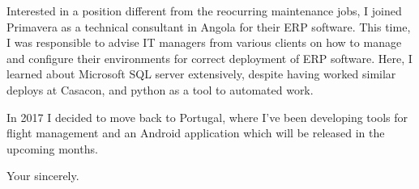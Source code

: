 \documentclass{letter}
\renewcommand*{\closing}[1]{\par\nobreak\vspace{\parskip}%
\vspace{2\parskip}%
#1\\[6\medskipamount]%
\fromsig
}
\begin{document}
\begin{letter}{}
Interested in a position different from the reocurring maintenance jobs, I joined Primavera as a
technical consultant in Angola for their ERP software. This time, I was responsible to advise IT
managers from various clients on how to manage and configure their environments for correct
deployment of ERP software. Here, I learned about Microsoft SQL server extensively, despite having
worked similar deploys at Casacon, and python as a tool to automated work.

In 2017 I decided to move back to Portugal, where I've been developing tools for flight management
and an Android application which will be released in the upcoming months.

\closing{Your sincerely.}
\end{letter}
\end{document}

